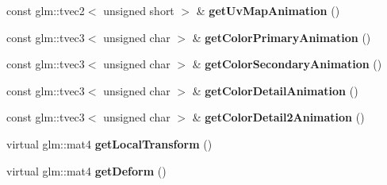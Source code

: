 \begin{DoxyCompactItemize}
\mbox{\label{classTarbora_1_1AnimatedNode_a184531fec66eb3f9e53c3432942b51d2}} 
const glm\+::tvec2$<$ unsigned short $>$ \& {\bfseries get\+Uv\+Map\+Animation} ()
\item 
\mbox{\label{classTarbora_1_1AnimatedNode_a06713d98a7b6cb58aab0b88bca3516fb}} 
const glm\+::tvec3$<$ unsigned char $>$ \& {\bfseries get\+Color\+Primary\+Animation} ()
\item 
\mbox{\label{classTarbora_1_1AnimatedNode_a5a24c0231010fc0ccc022eb6aed40a70}} 
const glm\+::tvec3$<$ unsigned char $>$ \& {\bfseries get\+Color\+Secondary\+Animation} ()
\item 
\mbox{\label{classTarbora_1_1AnimatedNode_a2d401e3ab855f9190b1e75c491b7144e}} 
const glm\+::tvec3$<$ unsigned char $>$ \& {\bfseries get\+Color\+Detail\+Animation} ()
\item 
\mbox{\label{classTarbora_1_1AnimatedNode_abbf3c7d7ec39ab9ce0d2ba26c83d4f97}} 
const glm\+::tvec3$<$ unsigned char $>$ \& {\bfseries get\+Color\+Detail2\+Animation} ()
\item 
\mbox{\label{classTarbora_1_1AnimatedNode_a384a1b6cf9e5895aab591230cf95eb1b}} 
virtual glm\+::mat4 {\bfseries get\+Local\+Transform} ()
\item 
\mbox{\label{classTarbora_1_1AnimatedNode_ab4b9aff67108cbdcae4384dec91e370b}} 
virtual glm\+::mat4 {\bfseries get\+Deform} ()
\end{DoxyCompactItemize}
